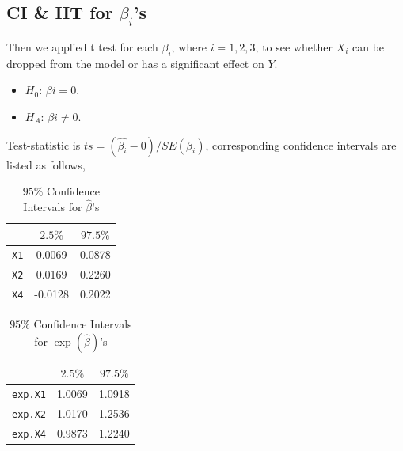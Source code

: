 \documentclass[a4paper,11pt,onecolumn,twoside]{article}
\begin{document}
\subsection{CI \& HT for $\beta_{i}$'s}
Then we applied t test for each $\beta_{i}$, where $i = 1, 2, 3$, to see whether $X_{i}$ can be dropped from the model or has a significant effect on $Y$.\par
\begin{itemize}
	\item $H_{0}$: $\beta{i} = 0$. 
	\item $H_{A}$: $\beta{i} \neq 0$.
\end{itemize}
\par
Test-statistic is $ts=(\hat{\beta_{i}}-0)/SE(\beta_{i})$, corresponding confidence intervals are listed as follows,\par
\begin{table}[H]
	\centering
	\begin{tabular}{ccc}
		\midrule[1.5pt]
		&$2.5\%$&$97.5\%$\\
		\hline 
		\texttt{X1} & 0.0069  &0.0878\\ 
		\texttt{X2} & 0.0169  &0.2260\\
		\texttt{X4} &-0.0128  &0.2022\\ 
		\midrule[1.5pt]
	\end{tabular}
	\caption{$95\%$ Confidence Intervals for $\hat{\beta}$'s}
\end{table}

\begin{table}[H]
	\centering
	\begin{tabular}{ccc}
		\midrule[1.5pt]
		&$2.5\%$&$97.5\%$\\
		\hline 
		\texttt{exp.X1}&1.0069 &1.0918\\
		\texttt{exp.X2}&1.0170 &1.2536\\
		\texttt{exp.X4}&0.9873 &1.2240\\
		\midrule[1.5pt]
	\end{tabular}
	\caption{$95\%$ Confidence Intervals for $\exp(\hat{\beta})$'s}
\end{table}
\end{document}
